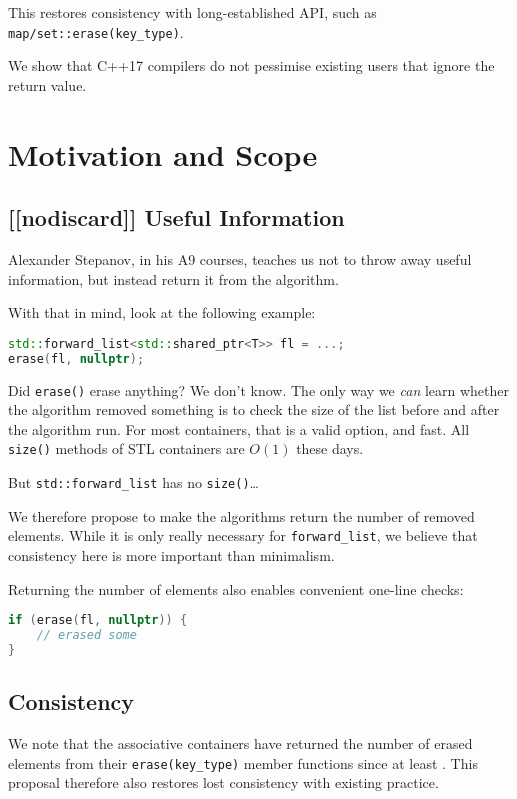\documentclass[11pt]{article}
\begin{document}
This restores consistency with long-established API, such as
\texttt{map/set::erase(key\_type)}.

We show that C++17 compilers do not pessimise existing users that
ignore the return value.

\section{Motivation and Scope}

\subsection{[[nodiscard]] Useful Information}

Alexander Stepanov, in his A9 courses\cite{A9}, teaches us not to
throw away useful information, but instead return it from the
algorithm.

With that in mind, look at the following example:
\begin{lstlisting}[language=C++]
std::forward_list<std::shared_ptr<T>> fl = ...;
erase(fl, nullptr);
\end{lstlisting}
Did \texttt{erase()} erase anything? We don't know. The only way we
\emph{can} learn whether the algorithm removed something is to check
the size of the list before and after the algorithm run. For most
containers, that is a valid option, and fast. All \texttt{size()}
methods of STL containers are $O(1)$ these days.

But \texttt{std::forward\_list} has no \texttt{size()}\ldots

We therefore propose to make the algorithms return the number of
removed elements. While it is only really necessary for
\texttt{forward\_list}, we believe that consistency here is more
important than minimalism.

Returning the number of elements also enables convenient one-line
checks:
\begin{lstlisting}[language=C++]
if (erase(fl, nullptr)) {
    // erased some
}
\end{lstlisting}

\subsection{Consistency}

We note that the associative containers have returned the number of
erased elements from their \texttt{erase(key\_type)} member functions
since at least \cite{STL}. This proposal therefore also restores
lost consistency with existing practice.
\end{document}
